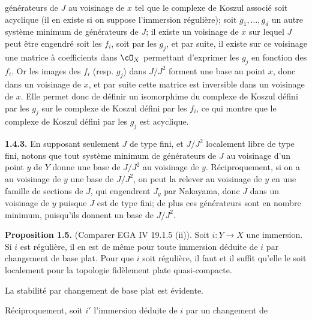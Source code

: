 générateurs de $J$ au voisinage de $x$ tel que le complexe de Koszul associé soit acyclique (il en existe si on suppose l'immersion régulière); soit $g_1,\ldots,g_d$ un autre système minimum de générateurs de $J$; il existe un voisinage de $x$ sur lequel $J$ peut être engendré soit les $f_i$, soit par les $g_j$, et par suite, il existe sur ce voisinage une matrice à coefficients dans $\cO_X$ permettant d'exprimer les $g_j$ en fonction des $f_i$. Or les images des $f_i$ (resp. $g_j$) dans $J/J^2$ forment une base au point $x$, donc dans un voisinage de $x$, et par suite cette matrice est inversible dans un voisinage de $x$. Elle permet donc de définir un isomorphime du complexe de Koszul défini par les $g_j$ sur le complexe de Koszul défini par les $f_i$, ce qui montre que le complexe de Koszul défini par les $g_j$ est acyclique.

\textbf{1.4.3.} En supposant seulement $J$ de type fini, et $J/J^2$ localement libre de type fini, notons que tout système minimum de générateurs de $J$ au voisinage d'un point $y$ de $Y$ donne une base de $J/J^2$ au voisinage de $y$. Réciproquement, si on a au voisinage de $y$ une base de $J/J^2$, on peut la relever au voisinage de $y$ en une famille de sections de $J$, qui engendrent $J_y$ par Nakayama, donc $J$ dans un voisinage de $\ddot y$ puisque $J$ est de type fini; de plus ces générateurs sont en nombre minimum, puisqu'ils donnent un base de $J/J^2$.

\textbf{Proposition 1.5.} (Comparer EGA IV 19.1.5 (ii)). Soit $i:Y\longrightarrow X$ une immersion. Si $i$ est régulière, il en est de même pour toute immersion déduite de $i$ par changement de base plat. Pour que $i$ soit régulière, il faut et il suffit qu'elle le soit localement pour la topologie fidèlement plate quasi-compacte.

La stabilité par changement de base plat est évidente.

Réciproquement, soit $i'$ l'immersion déduite de $i$ par un changement de
